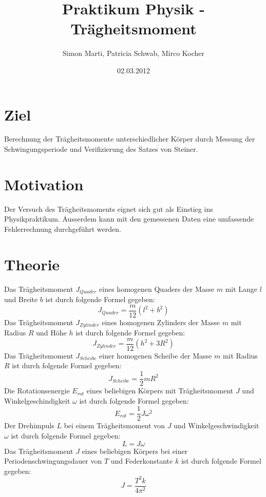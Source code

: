 \documentclass[12pt,a4paper]{article}
\title{Praktikum Physik - Tr\"agheitsmoment}
\author{Simon Marti, Patricia Schwab, Mirco Kocher}
\date{02.03.2012}
\begin{document}
\maketitle

\section*{Ziel}
Berechnung der Tr\"agheitsmomente unterschiedlicher K\"orper durch Messung der Schwingungsperiode und Verifizierung des Satzes von Steiner.

\section*{Motivation}
Der Versuch des Tr\"agheitsmoments eignet sich gut als Einstieg ins Physikpraktikum. Ausserdem kann mit den gemessenen Daten eine umfassende Fehlerrechnung durchgef\"uhrt werden.

\section*{Theorie}
Das Tr\"agheitsmoment $J_{Quader}$ eines homogenen Quaders der Masse $m$ mit Lange $l$ und Breite $b$ ist durch folgende Formel gegeben:
\begin{equation}
 J_{Quader} = \frac{m}{12}(l^2 + b^2)
\end{equation}
Das Tr\"agheitsmoment $J_{Zylinder}$ eines homogenen Zylinders der Masse $m$ mit Radius $R$ und H\"ohe $h$ ist durch folgende Formel gegeben:
\begin{equation}
J_{Zylinder} = \frac{m}{12}(h^2 + 3R^2)
\end{equation}
Das Tr\"agheitsmoment $J_{Scheibe}$ einer homogenen Scheibe der Masse $m$ mit Radius $R$ ist durch folgende Formel gegeben:
\begin{equation}
J_{Scheibe} = \frac{1}{2}mR^2
\end{equation}
Die Rotationsenergie $E_{rot}$ eines beliebigen K\"orpers mit Tr\"agheitsmoment $J$ und Winkelgeschindigkeit $\omega$ ist durch folgende Formel gegeben:
\begin{equation}
E_{rot} = \frac{1}{2}J\omega^2
\end{equation}
Der Drehimpuls $L$ bei einem Tr\"agheitsmoment von $J$ und Winkelgeschwindigkeit $\omega$ ist durch folgende Formel gegeben:
\begin{equation}
L = J\omega
\end{equation}
Das Tr\"agheitsmoment $J$ eines beliebigen K\"orpers bei einer Periodenschwingungsdauer von $T$ und Federkonstante $k$ ist durch folgende Formel gegeben:
\begin{equation} \label{eq:k}
J = \frac{T^2k}{4\pi^2}
\end{equation}
\end{document}
